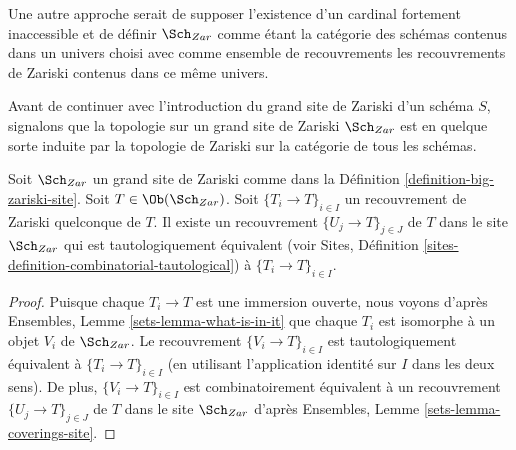\medskip\noindent
Une autre approche serait de supposer l'existence d'un cardinal fortement inaccessible et de définir $\Sch_{Zar}$ comme étant la catégorie des schémas contenus dans un univers choisi avec comme ensemble de recouvrements les recouvrements de Zariski contenus dans ce même univers.

\medskip\noindent
Avant de continuer avec l'introduction du grand site de Zariski d'un schéma $S$, signalons que la topologie sur un grand site de Zariski $\Sch_{Zar}$ est en quelque sorte induite par la topologie de Zariski sur la catégorie de tous les schémas.

\begin{lemma}
\label{lemma-zariski-induced}
Soit $\Sch_{Zar}$ un grand site de Zariski comme dans la Définition \ref{definition-big-zariski-site}. Soit $T \in \Ob(\Sch_{Zar})$. Soit $\{T_i \to T\}_{i \in I}$ un recouvrement de Zariski quelconque de $T$. Il existe un recouvrement $\{U_j \to T\}_{j \in J}$ de $T$ dans le site $\Sch_{Zar}$ qui est tautologiquement équivalent (voir Sites, Définition \ref{sites-definition-combinatorial-tautological}) à $\{T_i \to T\}_{i \in I}$.
\end{lemma}

\begin{proof}
Puisque chaque $T_i \to T$ est une immersion ouverte, nous voyons d'après Ensembles, Lemme \ref{sets-lemma-what-is-in-it} que chaque $T_i$ est isomorphe à un objet $V_i$ de $\Sch_{Zar}$. Le recouvrement $\{V_i \to T\}_{i \in I}$ est tautologiquement équivalent à $\{T_i \to T\}_{i \in I}$ (en utilisant l'application identité sur $I$ dans les deux sens). De plus, $\{V_i \to T\}_{i \in I}$ est combinatoirement équivalent à un recouvrement $\{U_j \to T\}_{j \in J}$ de $T$ dans le site $\Sch_{Zar}$ d'après Ensembles, Lemme \ref{sets-lemma-coverings-site}.
\end{proof}

